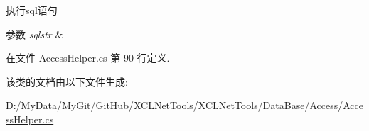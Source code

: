 执行sql语句 


\begin{DoxyParams}{参数}
{\em sqlstr} & \\
\hline
\end{DoxyParams}


在文件 Access\-Helper.\-cs 第 90 行定义.



该类的文档由以下文件生成\-:\begin{DoxyCompactItemize}
\item 
D\-:/\-My\-Data/\-My\-Git/\-Git\-Hub/\-X\-C\-L\-Net\-Tools/\-X\-C\-L\-Net\-Tools/\-Data\-Base/\-Access/\hyperlink{_access_helper_8cs}{Access\-Helper.\-cs}\end{DoxyCompactItemize}
